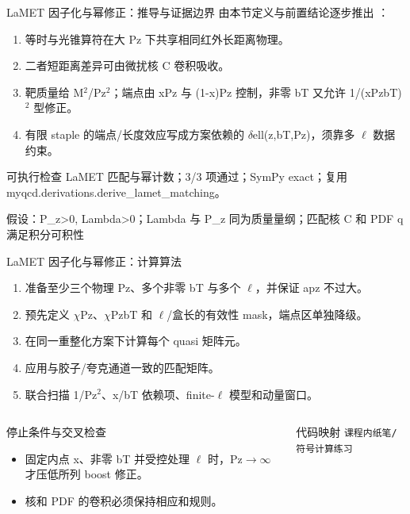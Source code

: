 \begin{frame}[t]{LaMET 因子化与幂修正：推导与证据边界}
\footnotesize
{}\quad 由本节定义与前置结论逐步推出 ：
\begin{enumerate}
\item 等时与光锥算符在大 Pz 下共享相同红外长距离物理。
\item 二者短距离差异可由微扰核 C 卷积吸收。
\item 靶质量给 M\ensuremath{^{2}}/\allowbreak{}Pz\ensuremath{^{2}}；端点由 xPz 与 (1-x)Pz 控制，非零 bT 又允许 1/\allowbreak{}(xPzbT)\ensuremath{^{2}} 型修正。
\item 有限 staple 的端点/\allowbreak{}长度效应写成方案依赖的 \ensuremath{\delta}ell(z,bT,Pz)，须靠多 \ensuremath{\ell} 数据约束。
\end{enumerate}\begin{block}{可执行检查}
\quad LaMET 匹配与幂计数；3/3 项通过；SymPy exact；复用 myqcd.derivations.derive\_lamet\_matching。
\par\scriptsize 假设：P\_z>0, Lambda>0；Lambda 与 P\_z 同为质量量纲；匹配核 C 和 PDF q 满足积分可积性
\end{block}
\end{frame}

\begin{frame}[t]{LaMET 因子化与幂修正：计算算法}
\footnotesize
{}\begin{enumerate}
\item 准备至少三个物理 Pz、多个非零 bT 与多个 \ensuremath{\ell}，并保证 apz 不过大。
\item 预先定义 \ensuremath{\chi}Pz、\ensuremath{\chi}PzbT 和 \ensuremath{\ell}/\allowbreak{}盒长的有效性 mask，端点区单独降级。
\item 在同一重整化方案下计算每个 quasi 矩阵元。
\item 应用与胶子/\allowbreak{}夸克通道一致的匹配矩阵。
\item 联合扫描 1/\allowbreak{}Pz\ensuremath{^{2}}、x/\allowbreak{}bT 依赖项、finite-\ensuremath{\ell} 模型和动量窗口。
\end{enumerate}\begin{columns}[T,onlytextwidth]
\begin{block}{停止条件与交叉检查}\scriptsize\begin{itemize}
\item[\CheckMark] 固定内点 x、非零 bT 并受控处理 \ensuremath{\ell} 时，Pz\ensuremath{\rightarrow}\ensuremath{\infty} 才压低所列 boost 修正。
\item[\CheckMark] 核和 PDF 的卷积必须保持相应和规则。
\end{itemize}\end{block}
\begin{block}{代码映射}
\scriptsize \texttt{课程内纸笔/\allowbreak{}符号计算练习}
\end{block}\end{columns}\end{frame}

